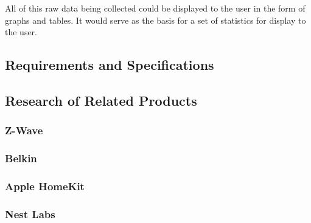 All of this raw data being collected could be displayed to the user in the form of graphs and tables. It would serve as the basis for a set of statistics for display to the user.

\subsection{Requirements and Specifications}

\subsection{Research of Related Products}

\subsubsection{Z-Wave}

\subsubsection{Belkin}

\subsubsection{Apple HomeKit}

\subsubsection{Nest Labs}

